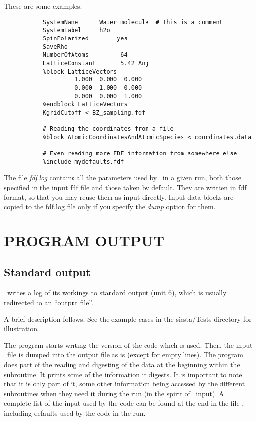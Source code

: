 \noindent
These are some examples:

\begin{verbatim}
           SystemName      Water molecule  # This is a comment
           SystemLabel     h2o
           SpinPolarized        yes
           SaveRho
           NumberOfAtoms         64
           LatticeConstant       5.42 Ang
           %block LatticeVectors
                    1.000  0.000  0.000
                    0.000  1.000  0.000
                    0.000  0.000  1.000
           %endblock LatticeVectors
           KgridCutoff < BZ_sampling.fdf

           # Reading the coordinates from a file
           %block AtomicCoordinatesAndAtomicSpecies < coordinates.data

           # Even reading more FDF information from somewhere else
           %include mydefaults.fdf
\end{verbatim}

The file \textit{fdf.log} contains all the parameters used by \siesta\
in a given run, both those specified in the input fdf file and
those taken by default. They are written in fdf format, so that
you may reuse them as input directly. Input data blocks are
copied to the fdf.log file only if you specify the \textit{dump} option
for them.

\section{PROGRAM OUTPUT}

\subsection{Standard output} 

\siesta\ writes a log of its workings to standard output (unit 6),
which is usually redirected to an ``output file''.

A brief description follows. See the example cases in the
siesta/Tests directory for illustration.

The program starts writing the version of the code which is
used. Then, the input \fdflib\ file is dumped into the output file as is
(except for empty lines). The program does part of the reading and
digesting of the data at the beginning within the \program{redata}
subroutine. It prints some of the information it digests. It is
important to note that it is only part of it, some other information
being accessed by the different subroutines when they need it during
the run (in the spirit of \fdflib\ input).  A complete list of the input
used by the code can be found at the end in the file \shell{fdf.log},
including defaults used by the code in the run.

